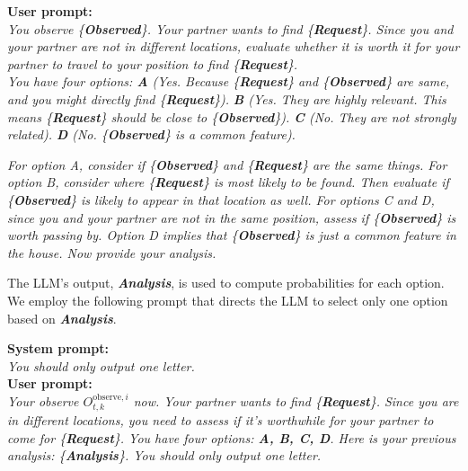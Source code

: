 \colorbox{lime!20}{
\parbox{\dimexpr0.90\linewidth-2\fboxsep}{
\fontsize{8.5pt}{\baselineskip}\selectfont
\textbf{User prompt:} \\
\textit{You observe \{\textbf{Observed}\}. Your partner wants to find \{\textbf{Request}\}. Since you and your partner are not in different locations, evaluate whether it is worth it for your partner to travel to your position to find \{\textbf{Request}\}.\\ 
You have four options: \textbf{A} (Yes. Because \{\textbf{Request}\} and \{\textbf{Observed}\} are same, 
and you might directly find \{\textbf{Request}\}).}
\textit{
\textbf{B} (Yes. They are highly relevant. This means \{\textbf{Request}\} should be close to \{\textbf{Observed}\}).
\textbf{C} (No. They are not strongly related).   
\textbf{D} (No. \{\textbf{Observed}\} is a common feature).}

\textit{For option A, consider if \{\textbf{Observed}\} and \{\textbf{Request}\} are the same things.  
For option B, consider where \{\textbf{Request}\} is most likely to be found. Then evaluate if \{\textbf{Observed}\} is likely to appear in that location as well. 
For options C and D, since you and your partner are not in the same position, assess if \{\textbf{Observed}\} is worth passing by. 
Option D implies that \{\textbf{Observed}\} is just a common feature in the house. 
Now provide your analysis.}
}}
\vspace{+0.13 cm}

The LLM's output, \textit{\textbf{Analysis}}, is used to compute probabilities for each option. We employ the following prompt that directs the LLM to select only one option based on \textit{\textbf{Analysis}}.

\vspace{0.13cm}
\colorbox{lime!20}{
\parbox{\dimexpr0.90\linewidth-2\fboxsep}{
\fontsize{8.5pt}{\baselineskip}\selectfont
\textbf{System prompt:} \\
\textit{You should only output one letter.} \\
\textbf{User prompt:} \\
\textit{
Your observe $O^{\text{observe},i}_{t,k}$ now. Your partner wants to find \{\textbf{Request}\}. 
Since you are in different locations, you need to assess if it's worthwhile for your partner to come for \{\textbf{Request}\}. 
You have four options: \textbf{A, B, C, D}. Here is your previous analysis: \{\textbf{Analysis}\}. You should only output one letter.}
}}
\vspace{0.13cm}

